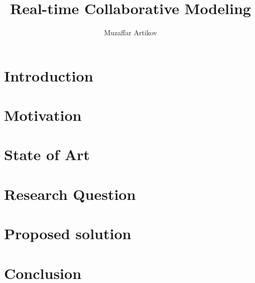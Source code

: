\documentclass[12pt, oneside]{article}
\title{Real-time Collaborative Modeling}
\author{Muzaffar Artikov}
\date{}
\begin{document}
\maketitle

\section{Introduction}

\section{Motivation}

\section{State of Art}

\section{Research Question}

\section{Proposed solution}

\section{Conclusion}




\end{document}
